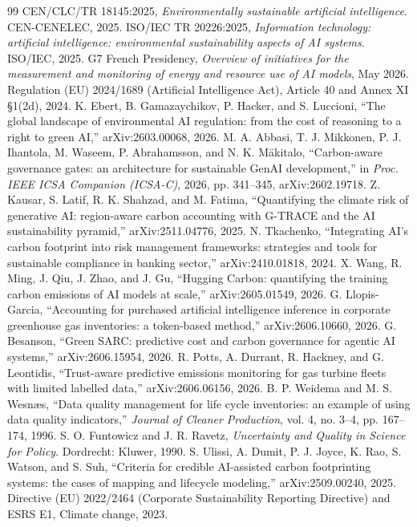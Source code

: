 \documentclass[10pt,conference]{IEEEtran}
\begin{document}
\begin{thebibliography}{99}
\footnotesize
{} CEN/CLC/TR 18145:2025, \emph{Environmentally sustainable
artificial intelligence}. CEN-CENELEC, 2025.
 ISO/IEC TR 20226:2025, \emph{Information technology:
artificial intelligence: environmental sustainability aspects of AI systems}.
ISO/IEC, 2025.
 G7 French Presidency, \emph{Overview of initiatives for the
measurement and monitoring of energy and resource use of AI models}, May 2026.
 Regulation (EU) 2024/1689 (Artificial Intelligence Act),
Article 40 and Annex XI \S1(2d), 2024.
 K. Ebert, B. Gamazaychikov, P. Hacker, and S. Luccioni, ``The
global landscape of environmental AI regulation: from the cost of reasoning to
a right to green AI,'' arXiv:2603.00068, 2026.
 M. A. Abbasi, T. J. Mikkonen, P. J. Ihantola, M. Waseem,
P. Abrahamsson, and N. K. M\"akitalo, ``Carbon-aware governance gates: an
architecture for sustainable GenAI development,'' in \emph{Proc. IEEE ICSA
Companion (ICSA-C)}, 2026, pp. 341--345, arXiv:2602.19718.
 Z. Kausar, S. Latif, R. K. Shahzad, and M. Fatima,
``Quantifying the climate risk of generative AI: region-aware carbon accounting
with G-TRACE and the AI sustainability pyramid,'' arXiv:2511.04776, 2025.
 N. Tkachenko, ``Integrating AI's carbon footprint into risk
management frameworks: strategies and tools for sustainable compliance in
banking sector,'' arXiv:2410.01818, 2024.
 X. Wang, R. Ming, J. Qiu, J. Zhao, and J. Gu,
``Hugging Carbon: quantifying the training carbon emissions of AI models at
scale,'' arXiv:2605.01549, 2026.
 G. Llopis-Garcia, ``Accounting for purchased artificial
intelligence inference in corporate greenhouse gas inventories: a token-based
method,'' arXiv:2606.10660, 2026.
 G. Besanson, ``Green SARC: predictive cost and carbon
governance for agentic AI systems,'' arXiv:2606.15954, 2026.
 R. Potts, A. Durrant, R. Hackney, and G. Leontidis,
``Trust-aware predictive emissions monitoring for gas turbine fleets with
limited labelled data,'' arXiv:2606.06156, 2026.
 B. P. Weidema and M. S. Wesn\ae s, ``Data quality management
for life cycle inventories: an example of using data quality indicators,''
\emph{Journal of Cleaner Production}, vol. 4, no. 3--4, pp. 167--174, 1996.
 S. O. Funtowicz and J. R. Ravetz, \emph{Uncertainty and Quality
in Science for Policy}. Dordrecht: Kluwer, 1990.
 S. Ulissi, A. Dumit, P. J. Joyce, K. Rao, S. Watson, and
S. Suh, ``Criteria for credible AI-assisted carbon footprinting systems: the
cases of mapping and lifecycle modeling,'' arXiv:2509.00240, 2025.
 Directive (EU) 2022/2464 (Corporate Sustainability Reporting
Directive) and ESRS E1, Climate change, 2023.
\end{thebibliography}
\end{document}
